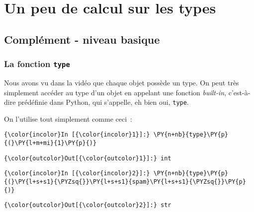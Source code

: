     
    
    
    

    

    \hypertarget{un-peu-de-calcul-sur-les-types}{%
\section{Un peu de calcul sur les
types}\label{un-peu-de-calcul-sur-les-types}}

    \hypertarget{compluxe9ment---niveau-basique}{%
\subsection{Complément - niveau
basique}\label{compluxe9ment---niveau-basique}}

    \hypertarget{la-fonction-type}{%
\subsubsection{\texorpdfstring{La fonction
\texttt{type}}{La fonction type}}\label{la-fonction-type}}

    Nous avons vu dans la vidéo que chaque objet possède un type. On peut
très simplement accéder au type d'un objet en appelant une fonction
\emph{built-in}, c'est-à-dire prédéfinie dans Python, qui s'appelle, eh
bien oui, \texttt{type}.

    On l'utilise tout simplement comme ceci~:

    \begin{Verbatim}[commandchars=\\\{\}]
{\color{incolor}In [{\color{incolor}1}]:} \PY{n+nb}{type}\PY{p}{(}\PY{l+m+mi}{1}\PY{p}{)}
\end{Verbatim}


\begin{Verbatim}[commandchars=\\\{\}]
{\color{outcolor}Out[{\color{outcolor}1}]:} int
\end{Verbatim}
            
    \begin{Verbatim}[commandchars=\\\{\}]
{\color{incolor}In [{\color{incolor}2}]:} \PY{n+nb}{type}\PY{p}{(}\PY{l+s+s1}{\PYZsq{}}\PY{l+s+s1}{spam}\PY{l+s+s1}{\PYZsq{}}\PY{p}{)}
\end{Verbatim}


\begin{Verbatim}[commandchars=\\\{\}]
{\color{outcolor}Out[{\color{outcolor}2}]:} str
\end{Verbatim}
            
